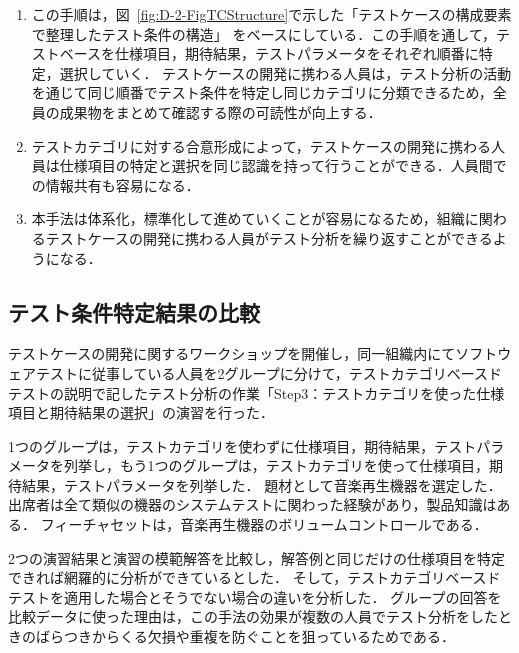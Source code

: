 \begin{enumerate}
\item この手順は，図~\ref{fig:D-2-FigTCStructure}で示した「テストケースの構成要素で整理したテスト条件の構造」
をベースにしている．この手順を通して，テストベースを仕様項目，期待結果，テストパラメータをそれぞれ順番に特定，選択していく．
テストケースの開発に携わる人員は，テスト分析の活動を通じて同じ順番でテスト条件を特定し同じカテゴリに分類できるため，全員の成果物をまとめて確認する際の可読性が向上する．
\item テストカテゴリに対する合意形成によって，テストケースの開発に携わる人員は仕様項目の特定と選択を同じ認識を持って行うことができる．人員間での情報共有も容易になる．
\item 本手法は体系化，標準化して進めていくことが容易になるため，組織に関わるテストケースの開発に携わる人員がテスト分析を繰り返すことができるようになる．
\end{enumerate}

\subsection{テスト条件特定結果の比較}

テストケースの開発に関するワークショップを開催し，同一組織内にてソフトウェアテストに従事している人員を2グループに分けて，テストカテゴリベースドテストの説明で記したテスト分析の作業「Step3：テストカテゴリを使った仕様項目と期待結果の選択」の演習を行った．

1つのグループは，テストカテゴリを使わずに仕様項目，期待結果，テストパラメータを列挙し，もう1つのグループは，テストカテゴリを使って仕様項目，期待結果，テストパラメータを列挙した．
題材として音楽再生機器を選定した．出席者は全て類似の機器のシステムテストに関わった経験があり，製品知識はある．
フィーチャセットは，音楽再生機器のボリュームコントロールである．

2つの演習結果と演習の模範解答を比較し，解答例と同じだけの仕様項目を特定できれば網羅的に分析ができているとした．
そして，テストカテゴリベースドテストを適用した場合とそうでない場合の違いを分析した．
グループの回答を比較データに使った理由は，この手法の効果が複数の人員でテスト分析をしたときのばらつきからくる欠損や重複を防ぐことを狙っているためである．

